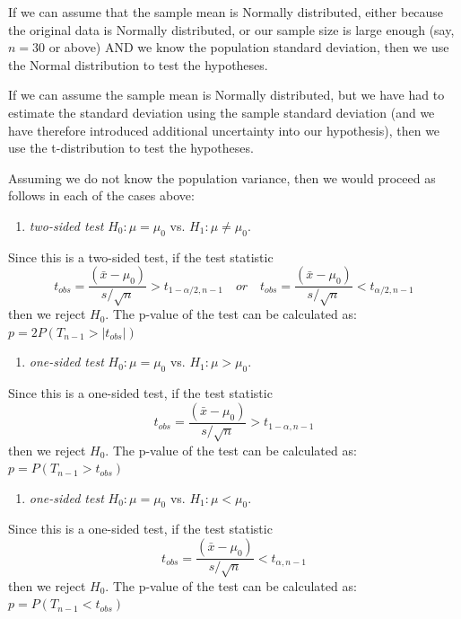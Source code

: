 \documentclass[12pt,a4paper,openany,twoside]{report}
\providecommand{\tightlist}{%
  \setlength{\itemsep}{0pt}\setlength{\parskip}{0pt}}
\renewcommand{\emph}[1]{\textcolor{Emerald}{\textit{#1}}}
\theoremstyle{definition}
\theoremstyle{remark}
\theoremstyle{plain}
\theoremstyle{definition}
\theoremstyle{definition}
\theoremstyle{definition}
\theoremstyle{remark}
\begin{document}
If we can assume that the sample mean is Normally distributed, either because the original data is Normally distributed, or our sample size is large enough (say,
\(n=30\) or above) AND we know the population standard deviation, then we use the Normal distribution to test the hypotheses.

If we can assume the sample mean is Normally distributed, but we have had to estimate the standard deviation using the sample standard deviation (and we have therefore
introduced additional uncertainty into our hypothesis), then we use the t-distribution to test the hypotheses.

Assuming we do not know the population variance, then we would proceed as follows in each of the cases above:

\begin{enumerate}
\def\labelenumi{\arabic{enumi}.}
\tightlist
\item
  \emph{two-sided test} \(H_0: \mu = \mu_0\) vs. \(H_1: \mu \neq \mu_0\).
\end{enumerate}

Since this is a two-sided test, if the test statistic
\[ t_{obs} = \frac{(\bar{x} - \mu_0)}{s/\sqrt{n}} > t_{1-\alpha/2, n-1} \quad {or} \quad t_{obs} = \frac{(\bar{x} - \mu_0)}{s/\sqrt{n}} < t_{\alpha/2, n-1}\]
then we reject \(H_0\). The p-value of the test can be calculated as: \(p = 2 P(T_{n-1} > |t_{obs}|)\)

\begin{enumerate}
\def\labelenumi{\arabic{enumi}.}
\setcounter{enumi}{1}
\tightlist
\item
  \emph{one-sided test} \(H_0: \mu = \mu_0\) vs. \(H_1: \mu > \mu_0\).
\end{enumerate}

Since this is a one-sided test, if the test statistic
\[ t_{obs} = \frac{(\bar{x} - \mu_0)}{s/\sqrt{n}} > t_{1-\alpha, n-1} \]
then we reject \(H_0\).
The p-value of the test can be calculated as: \(p = P(T_{n-1} > t_{obs})\)

\begin{enumerate}
\def\labelenumi{\arabic{enumi}.}
\setcounter{enumi}{2}
\tightlist
\item
  \emph{one-sided test} \(H_0: \mu = \mu_0\) vs. \(H_1: \mu < \mu_0\).
\end{enumerate}

Since this is a one-sided test, if the test statistic
\[ t_{obs} = \frac{(\bar{x} - \mu_0)}{s/\sqrt{n}} < t_{\alpha, n-1} \]
then we reject \(H_0\).
The p-value of the test can be calculated as: \(p = P(T_{n-1} < t_{obs})\)
\end{document}
